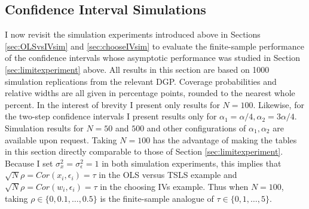 \subsection{Confidence Interval Simulations}
\label{sec:CIsim}
I now revisit the simulation experiments introduced above in Sections \ref{sec:OLSvsIVsim} and \ref{sec:chooseIVsim} to evaluate the finite-sample performance of the confidence intervals whose asymptotic performance was studied in Section \ref{sec:limitexperiment} above.
All results in this section are based on 1000 simulation replications from the relevant DGP.
Coverage probabilities and relative widths are all given in percentage points, rounded to the nearest whole percent.
In the interest of brevity I present only results for $N=100$.
Likewise, for the two-step confidence intervals I present results only for $\alpha_1 = \alpha/4, \alpha_2 = 3\alpha/4$.
Simulation results for $N=50$ and $500$ and other configurations of $\alpha_1,\alpha_2$ are available upon request.
Taking $N=100$ has the advantage of making the tables in this section directly comparable to those of Section \ref{sec:limitexperiment}.
Because I set $\sigma_x^2 = \sigma_\epsilon^2 = 1$ in both simulation experiments, this implies that $\sqrt{N}\rho = Cor(x_i,\epsilon_i) = \tau$ in the OLS versus TSLS example and $\sqrt{N}\rho = Cor(w_i, \epsilon_i) = \tau$ in the choosing IVs example. 
Thus when $N = 100$, taking $\rho \in \{0, 0.1, \dots, 0.5\}$ is the finite-sample analogue of $\tau \in \{0, 1, \dots, 5\}$.

